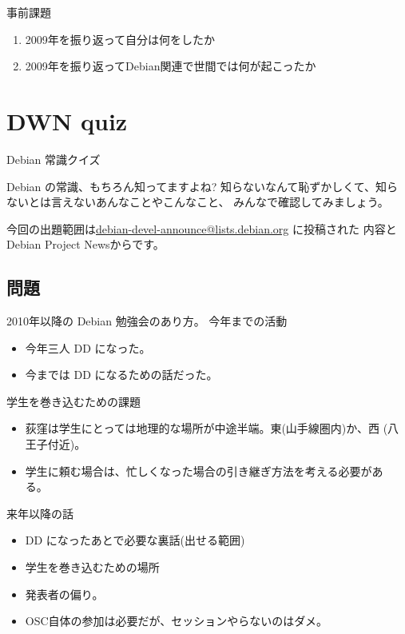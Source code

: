 
\begin{frame}{事前課題}
\begin{enumerate}
 \item 2009年を振り返って自分は何をしたか
 \item 2009年を振り返ってDebian関連で世間では何が起こったか
\end{enumerate}
\end{frame}

{\footnotesize

}


\section{DWN quiz}
\begin{frame}{Debian 常識クイズ}

Debian の常識、もちろん知ってますよね?
知らないなんて恥ずかしくて、知らないとは言えないあんなことやこんなこと、
みんなで確認してみましょう。

今回の出題範囲は\url{debian-devel-announce@lists.debian.org} に投稿された
内容とDebian Project Newsからです。

\end{frame}

\subsection{問題}
%

\begin{frame}{2010年以降の Debian 勉強会のあり方。}
今年までの活動
\begin{itemize}
 \item 今年三人 DD になった。
 \item 今までは DD になるための話だった。
\end{itemize}

学生を巻き込むための課題
\begin{itemize}
 \item 荻窪は学生にとっては地理的な場所が中途半端。東(山手線圏内)か、西
       (八王子付近)。
 \item 学生に頼む場合は、忙しくなった場合の引き継ぎ方法を考える必要があ
       る。

\end{itemize}
来年以降の話
\begin{itemize}
 \item DD になったあとで必要な裏話(出せる範囲)
 \item 学生を巻き込むための場所
 \item 発表者の偏り。
 \item OSC自体の参加は必要だが、セッションやらないのはダメ。
\end{itemize}
\end{frame}

